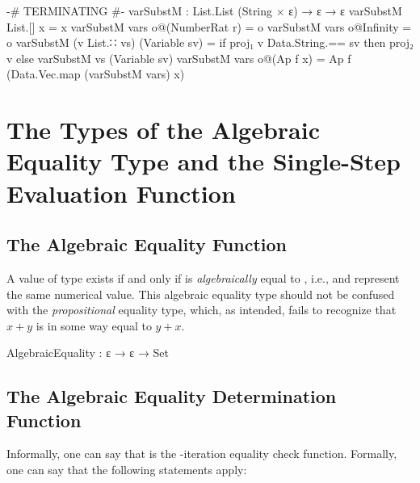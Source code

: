 \documentclass{report}
\begin{document}
\begin{code}
{-# TERMINATING #-}
varSubstM : List.List (String × ε) → ε → ε
varSubstM List.[] x = x
varSubstM vars o@(NumberRat r) = o
varSubstM vars o@Infinity = o
varSubstM (v List.∷ vs) (Variable sv) =
  if proj₁ v Data.String.== sv
     then proj₂ v
     else varSubstM vs (Variable sv)
varSubstM vars o@(Ap f x) = Ap f (Data.Vec.map (varSubstM vars) x)
\end{code}

\section{The Types of the Algebraic Equality Type and the Single-Step Evaluation Function}

\subsection{The Algebraic Equality Function}
A value of type    exists if and only if  is \emph{algebraically} equal to , i.e.,  and  represent the same numerical value.  This algebraic equality type should not be confused with the \emph{propositional} equality type, which, as intended, fails to recognize that \(x + y\) is in some way equal to \(y + x\).

\begin{code}
AlgebraicEquality : ε → ε → Set
\end{code}

\subsection{The Algebraic Equality Determination Function}
Informally, one can say that   is the -iteration equality check function. Formally, one can say that the following statements apply:
\end{document}

